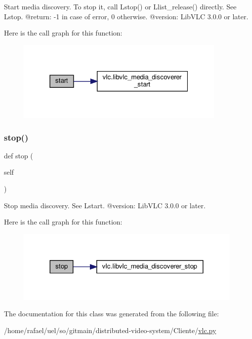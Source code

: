 \begin{DoxyVerb}Start media discovery.
To stop it, call L{stop}() or
L{list_release}() directly.
See L{stop}.
@return: -1 in case of error, 0 otherwise.
@version: LibVLC 3.0.0 or later.
\end{DoxyVerb}
 Here is the call graph for this function\+:
\nopagebreak
\begin{figure}[H]
\begin{center}
\leavevmode
\includegraphics[width=289pt]{classvlc_1_1_media_discoverer_af1af6ddf04f00f958949618f79c33b82_cgraph}
\end{center}
\end{figure}
\mbox{\label{classvlc_1_1_media_discoverer_a26ca7c1c7fcdd35378e7be97727047a6}} 
\subsubsection{\texorpdfstring{stop()}{stop()}}
{\footnotesize\ttfamily def stop (\begin{DoxyParamCaption}\item[{}]{self }\end{DoxyParamCaption})}

\begin{DoxyVerb}Stop media discovery.
See L{start}.
@version: LibVLC 3.0.0 or later.
\end{DoxyVerb}
 Here is the call graph for this function\+:
\nopagebreak
\begin{figure}[H]
\begin{center}
\leavevmode
\includegraphics[width=312pt]{classvlc_1_1_media_discoverer_a26ca7c1c7fcdd35378e7be97727047a6_cgraph}
\end{center}
\end{figure}


The documentation for this class was generated from the following file\+:\begin{DoxyCompactItemize}
\item 
/home/rafael/uel/so/gitmain/distributed-\/video-\/system/\+Cliente/\hyperlink{vlc_8py}{vlc.\+py}\end{DoxyCompactItemize}
